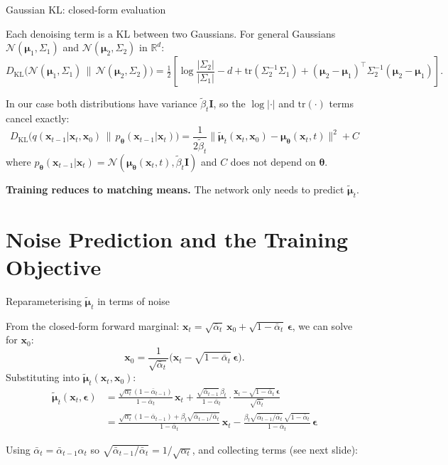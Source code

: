 \documentclass[aspectratio=169,11pt]{beamer}
\newcommand{\R}{\mathbb{R}}
\newcommand{\DKL}{D_{\mathrm{KL}}}
\newcommand{\Norm}{\mathcal{N}}
\newcommand{\bx}{\bm{x}}
\newcommand{\beps}{\bm{\epsilon}}
\newcommand{\bmu}{\bm{\mu}}
\newcommand{\btheta}{\bm{\theta}}
\newcommand{\half}{\tfrac{1}{2}}
\begin{document}
\begin{frame}{Gaussian KL: closed-form evaluation}

Each denoising term is a KL between two Gaussians.
For general Gaussians $\mathcal{N}(\bmu_1,\Sigma_1)$ and
$\mathcal{N}(\bmu_2,\Sigma_2)$ in $\R^d$:
\[
  \DKL\!\bigl(\Norm(\bmu_1,\Sigma_1)\,\|\,\Norm(\bmu_2,\Sigma_2)\bigr)
  = \half\!\left[
    \log\frac{|\Sigma_2|}{|\Sigma_1|}
    - d
    + \mathrm{tr}(\Sigma_2^{-1}\Sigma_1)
    + (\bmu_2-\bmu_1)^\top\Sigma_2^{-1}(\bmu_2-\bmu_1)
  \right].
\]

\medskip
In our case both distributions have variance $\tilde\beta_t\mathbf{I}$,
so the $\log|\cdot|$ and $\mathrm{tr}(\cdot)$ terms cancel exactly:
\[
  \DKL\!\bigl(q(\bx_{t-1}|\bx_t,\bx_0)\,\|\,p_{\btheta}(\bx_{t-1}|\bx_t)\bigr)
  = \frac{1}{2\tilde\beta_t}
    \bigl\|\tilde{\bmu}_t(\bx_t,\bx_0) - \bmu_{\btheta}(\bx_t,t)\bigr\|^2
  + C
\]
where $p_{\btheta}(\bx_{t-1}|\bx_t)=\Norm(\bmu_{\btheta}(\bx_t,t),\tilde\beta_t\mathbf{I})$
and $C$ does not depend on $\btheta$.

\medskip
\textbf{Training reduces to matching means.}
The network only needs to predict $\tilde{\bmu}_t$.
\end{frame}

\section{Noise Prediction and the Training Objective}

\begin{frame}{Reparameterising $\tilde{\bmu}_t$ in terms of noise}

From the closed-form forward marginal:
$\bx_t = \sqrt{\bar\alpha_t}\,\bx_0 + \sqrt{1-\bar\alpha_t}\,\beps$,
we can solve for $\bx_0$:
\[
  \bx_0 = \frac{1}{\sqrt{\bar\alpha_t}}\bigl(\bx_t - \sqrt{1-\bar\alpha_t}\,\beps\bigr).
\]
Substituting into $\tilde{\bmu}_t(\bx_t,\bx_0)$:
\begin{align*}
\tilde{\bmu}_t(\bx_t,\beps)
&= \frac{\sqrt{\alpha_t}(1-\bar\alpha_{t-1})}{1-\bar\alpha_t}\,\bx_t
 + \frac{\sqrt{\bar\alpha_{t-1}}\,\beta_t}{1-\bar\alpha_t}
   \cdot\frac{\bx_t - \sqrt{1-\bar\alpha_t}\,\beps}{\sqrt{\bar\alpha_t}}\\
&= \frac{\sqrt{\alpha_t}(1-\bar\alpha_{t-1}) + \beta_t\sqrt{\bar\alpha_{t-1}/\bar\alpha_t}}{1-\bar\alpha_t}\,\bx_t
 - \frac{\beta_t\sqrt{\bar\alpha_{t-1}/\bar\alpha_t}\,\sqrt{1-\bar\alpha_t}}{1-\bar\alpha_t}\,\beps
\end{align*}

Using $\bar\alpha_t = \bar\alpha_{t-1}\alpha_t$ so $\sqrt{\bar\alpha_{t-1}/\bar\alpha_t}=1/\sqrt{\alpha_t}$,
and collecting terms (see next slide):
\end{frame}
\end{document}
